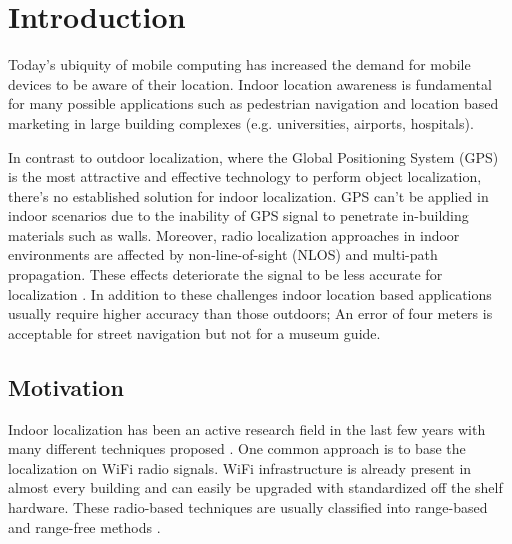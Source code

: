 
\chapter{Introduction} %

\label{Chapter1} %


\newcommand{\keyword}[1]{\textbf{#1}}
\newcommand{\tabhead}[1]{\textbf{#1}}
\newcommand{\code}[1]{\texttt{#1}}
\newcommand{\file}[1]{\texttt{\bfseries#1}}
\newcommand{\option}[1]{\texttt{\itshape#1}}


Today's ubiquity of mobile computing has increased the demand for mobile devices to be aware of their location. Indoor location awareness is fundamental for many possible applications such as pedestrian navigation and location based marketing in large building complexes (e.g. universities, airports, hospitals).

In contrast to outdoor localization, where the Global Positioning System (GPS) is the most attractive and effective technology to perform object localization, there's no established solution for indoor localization. GPS can't be applied in indoor scenarios due to the inability of GPS signal to penetrate in-building materials such  as walls. Moreover, radio localization approaches in indoor environments are affected by non-line-of-sight (NLOS) and multi-path propagation. These effects deteriorate the signal to be less accurate for localization \cite{JoseMaster,multipathEffects}. In addition to these challenges indoor location based applications usually require higher accuracy than those outdoors; An error of four meters is acceptable for street navigation but not for a museum guide.

\section{Motivation}

Indoor localization has been an active research field in the last few years with many different techniques proposed \cite{surveyIndoorTechniques,surveyWirelessPersonal}. One common approach is to base the localization on WiFi radio signals. WiFi infrastructure is already present in almost every building and can easily be upgraded with standardized off the shelf hardware. These radio-based techniques are usually classified into range-based and range-free methods \cite{FineGrainedIndoorTracking}.

